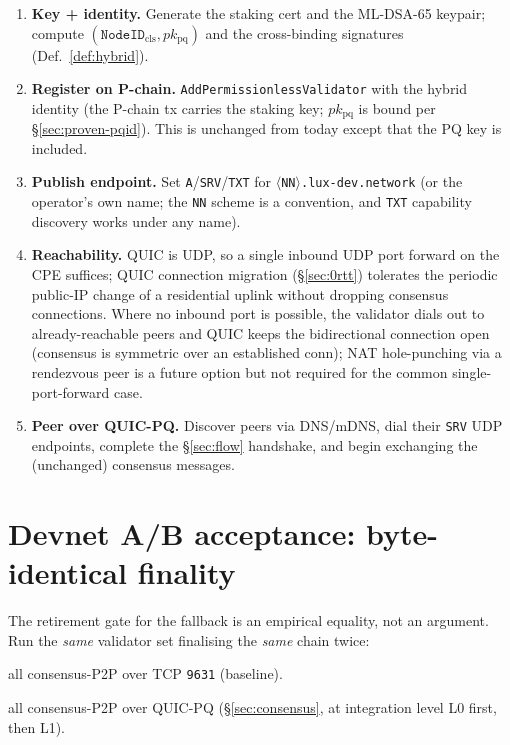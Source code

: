 \documentclass[11pt,a4paper]{article}
\newcommand{\code}[1]{\texttt{#1}}
\begin{document}
\begin{enumerate}[nosep]
  \item \textbf{Key + identity.} Generate the staking cert and the
        ML-DSA-65 keypair; compute
        $(\code{NodeID}_{\mathrm{cls}}, pk_{\mathrm{pq}})$ and the
        cross-binding signatures (Def.~\ref{def:hybrid}).
  \item \textbf{Register on P-chain.} \code{AddPermissionlessValidator}
        with the hybrid identity (the P-chain tx carries the staking key;
        $pk_{\mathrm{pq}}$ is bound per \S\ref{sec:proven-pqid}). This is
        unchanged from today except that the PQ key is included.
  \item \textbf{Publish endpoint.} Set \code{A}/\code{SRV}/\code{TXT} for
        \code{$\langle$NN$\rangle$.lux-dev.network} (or the operator's own
        name; the \code{NN} scheme is a convention, and \code{TXT}
        capability discovery works under any name).
  \item \textbf{Reachability.} QUIC is UDP, so a single inbound UDP port
        forward on the CPE suffices; QUIC connection migration
        (\S\ref{sec:0rtt}) tolerates the periodic public-IP change of a
        residential uplink without dropping consensus connections. Where
        no inbound port is possible, the validator dials out to
        already-reachable peers and QUIC keeps the bidirectional
        connection open (consensus is symmetric over an established
        conn); NAT hole-punching via a rendezvous peer is a future option
        but not required for the common single-port-forward case.
  \item \textbf{Peer over QUIC-PQ.} Discover peers via DNS/mDNS, dial
        their \code{SRV} UDP endpoints, complete the \S\ref{sec:flow}
        handshake, and begin exchanging the (unchanged) consensus
        messages.
\end{enumerate}

\section{Devnet A/B acceptance: byte-identical finality}\label{sec:ab}

The retirement gate for the fallback is an empirical equality, not an
argument. Run the \emph{same} validator set finalising the \emph{same}
chain twice:

\begin{description}[nosep,leftmargin=1.4cm]
  \item[Run A] all consensus-P2P over TCP \code{9631} (baseline).
  \item[Run B] all consensus-P2P over QUIC-PQ (\S\ref{sec:consensus}, at
        integration level L0 first, then L1).
\end{description}
\end{document}
